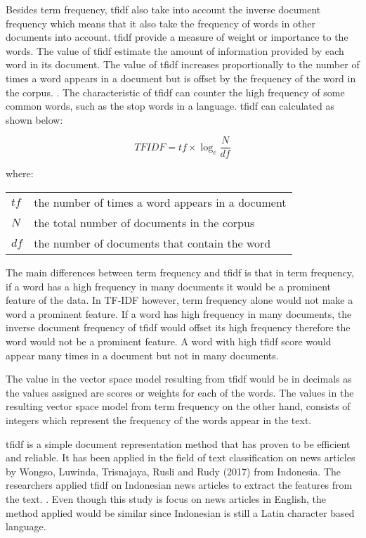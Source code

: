 Besides term frequency, \ac{tfidf} also take into account the inverse document frequency which means that it also take the frequency of words in other documents into account. \ac{tfidf} provide a measure of weight or importance to the words. The value of \ac{tfidf} estimate the amount of information provided by each word in its document. The value of \ac{tfidf} increases proportionally to the number of times a word appears in a document but is offset by the frequency of the word in the corpus. \cite{textMiningTfidf}. The characteristic of \ac{tfidf} can counter the high frequency of some common words, such as the stop words in a language. \Ac{tfidf} can calculated as shown below:

\begin{equation}
TFIDF = tf \times \log_e \frac{N}{df}
\end{equation}

where:

\begin{center}
	\begin{tabular}{l @{ $=$ } l}
		$tf$ & the number of times a word appears in a document \\
		$N$ & the total number of documents in the corpus \\
		$df$ & the number of documents that contain the word\\
	\end{tabular}
\end{center}

The main differences between term frequency and \ac{tfidf} is that in term frequency, if a word has a high frequency in many documents it would be a prominent feature of the data. In TF-IDF however, term frequency alone would not make a word a prominent feature. If a word has high frequency in many documents, the inverse document frequency of \ac{tfidf} would offset its high frequency therefore the word would not be a prominent feature. A word with high \ac{tfidf} score would appear many times in a document but not in many documents.

The value in the vector space model resulting from \ac{tfidf} would be in decimals as the values assigned are scores or weights for each of the words. The values in the resulting vector space model from term frequency on the other hand, consists of integers which represent the frequency of the words appear in the text.

\Ac{tfidf} is a simple document representation method that has proven to be efficient and reliable. It has been applied in the field of text classification on news articles by Wongso, Luwinda, Trisnajaya, Rusli and Rudy (2017) from Indonesia. The researchers applied \ac{tfidf} on Indonesian news articles to extract the features from the text. \cite{WONGSO2017137}. Even though this study is focus on news articles in English, the method applied would be similar since Indonesian is still a Latin character based language.

